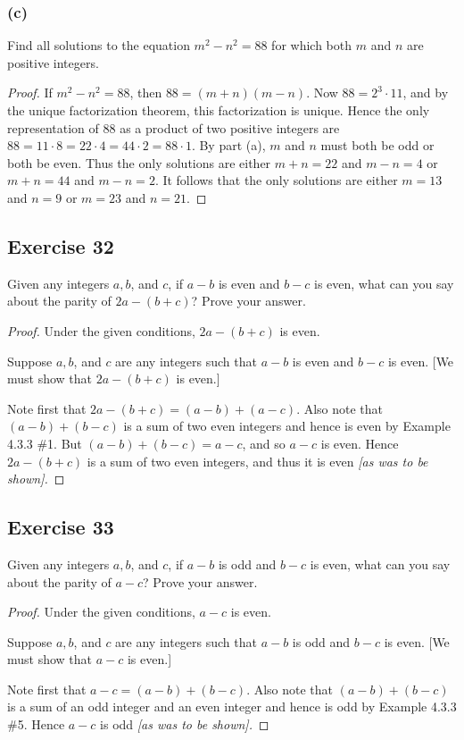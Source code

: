 \documentclass[14pt]{extarticle}
\begin{document}
\subsubsection{(c)}
Find all solutions to the equation $m^2 - n^2 = 88$ for which both $m$ and $n$ are positive integers.

\begin{proof}
    If $m^2 - n^2 = 88$, then $88 = (m + n)(m - n)$. Now $88 = 2^3 \cdot 11$, and by the unique factorization theorem, this factorization is unique. Hence the only representation of 88 as a product of two positive integers are $88 = 11\cdot8 = 22\cdot4 = 44\cdot2 = 88\cdot1$. By part (a), $m$ and $n$ must both be odd or both be even. Thus the only solutions are either $m + n = 22$ and $m - n = 4$ or $m + n = 44$ and $m - n = 2$. It follows that the only solutions are either $m = 13$ and $n = 9$ or $m = 23$ and $n = 21$.
\end{proof}

\subsection{Exercise 32}
Given any integers $a, b$, and $c$, if $a - b$ is even and $b - c$ is even, what can you say about the parity of $2a - (b + c)$? Prove your answer.

\begin{proof}
    Under the given conditions, $2a - (b + c)$ is even.

    Suppose $a, b$, and $c$ are any integers such that $a - b$
    is even and $b - c$ is even. [We must show that $2a - (b + c)$ is even.]

    Note first that $2a - (b + c) = (a - b) + (a - c)$. Also note that $(a - b) + (b - c)$ is a sum of two even integers and hence is even by Example 4.3.3 \#1. But $(a - b) + (b - c) = a - c$, and so $a - c$ is even. Hence $2a - (b + c)$ is a sum of two even integers, and thus it is even {\it [as was to be shown].}
\end{proof}

\subsection{Exercise 33}
Given any integers $a, b$, and $c$, if $a - b$ is odd and
$b - c$ is even, what can you say about the parity of
$a - c$? Prove your answer.

\begin{proof}
    Under the given conditions, $a - c$ is even.

    Suppose $a, b$, and $c$ are any integers such that $a - b$
    is odd and $b - c$ is even. [We must show that $a - c$ is even.]

    Note first that $a - c = (a - b) + (b - c)$. Also note that $(a - b) + (b - c)$ is a sum of an odd integer and an even integer and hence is odd by Example 4.3.3 \#5. Hence $a - c$ is odd {\it [as was to be shown].}
\end{proof}
\end{document}
